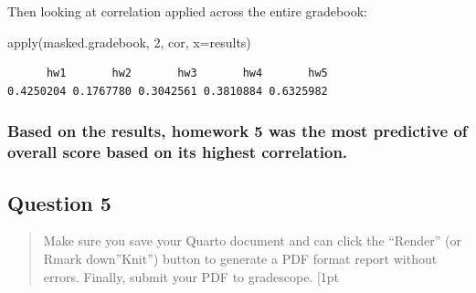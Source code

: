 \documentclass[
  letterpaper,
  DIV=11,
  numbers=noendperiod]{scrartcl}
\newenvironment{Shaded}{\begin{snugshade}}{\end{snugshade}}
\newcommand{\AttributeTok}[1]{\textcolor[rgb]{0.40,0.45,0.13}{#1}}
\newcommand{\DecValTok}[1]{\textcolor[rgb]{0.68,0.00,0.00}{#1}}
\newcommand{\FunctionTok}[1]{\textcolor[rgb]{0.28,0.35,0.67}{#1}}
\newcommand{\NormalTok}[1]{\textcolor[rgb]{0.00,0.23,0.31}{#1}}
\begin{document}
Then looking at correlation applied across the entire gradebook:

\begin{Shaded}
\begin{Highlighting}[]
\FunctionTok{apply}\NormalTok{(masked.gradebook, }\DecValTok{2}\NormalTok{, cor, }\AttributeTok{x=}\NormalTok{results) }
\end{Highlighting}
\end{Shaded}

\begin{verbatim}
      hw1       hw2       hw3       hw4       hw5 
0.4250204 0.1767780 0.3042561 0.3810884 0.6325982 
\end{verbatim}

\hypertarget{based-on-the-results-homework-5-was-the-most-predictive-of-overall-score-based-on-its-highest-correlation.}{%
\subsubsection{\texorpdfstring{Based on the results, \textbf{homework 5}
was the most predictive of overall score based on its highest
correlation.}{Based on the results, homework 5 was the most predictive of overall score based on its highest correlation.}}\label{based-on-the-results-homework-5-was-the-most-predictive-of-overall-score-based-on-its-highest-correlation.}}

\hypertarget{question-5}{%
\subsection{Question 5}\label{question-5}}

\begin{quote}
Make sure you save your Quarto document and can click the ``Render'' (or
Rmark down''Knit'') button to generate a PDF format report without
errors. Finally, submit your PDF to gradescope. {[}1pt
\end{quote}
\end{document}
